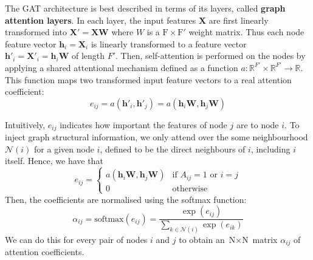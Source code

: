 \documentclass[12pt]{article}
\theoremstyle{definition}
\begin{document}
\bigskip

The GAT architecture is best described in terms of its layers, called \textbf{graph attention layers}. In each layer, the input features $\textbf{X}$ are first linearly transformed into $\textbf{X}' = \textbf{X}\textbf{W}$ where $W$ is a $\textrm{F} \times \textrm{F}'$ weight matrix. Thus each node feature vector $\mathbf{h}_i = \mathbf{X}_i$ is linearly transformed to a feature vector $\mathbf{h}'_i = \mathbf{X}'_i = \mathbf{h}_i \textbf{W}$ of length $F'$. Then, self-attention is performed on the nodes by applying a shared attentional mechanism defined as a function $a: \mathbb{R}^{F'} \times \mathbb{R}^{F'} \to \mathbb{R}$. This function maps two transformed input feature vectors to a real attention coefficient:
\[
e_{ij} = a(\mathbf{h}'_i, \mathbf{h}'_j) = a(\mathbf{h}_i \textbf{W}, \mathbf{h}_j \textbf{W})
\]

Intuitively, $e_{ij}$ indicates how important the features of node $j$ are to node $i$. To inject graph structural information, we only attend over the some neighbourhood $\mathcal{N}(i)$ for a given node $i$, defined to be the direct neighbours of $i$, including $i$ itself. Hence, we have that
\begin{equation*}
e_{ij} = \begin{cases}
				a(\mathbf{h}_i \textbf{W}, \mathbf{h}_j \textbf{W}) &\text{if $A_{ij} = 1$ or $i = j$}\\
				0 &\text{otherwise}
			\end{cases}
\end{equation*}
Then, the coefficients are normalised using the softmax function:
\[
\alpha_{ij} = \textrm{softmax}(e_{ij}) = \frac{\exp(e_{ij})}{\sum_{k \in \mathcal{N}(i)} \exp(e_{ik})}
\]
We can do this for every pair of nodes $i$ and $j$ to obtain an $\textrm{N} \times \textrm{N}$ matrix $\alpha_{ij}$ of attention coefficients.
\end{document}
